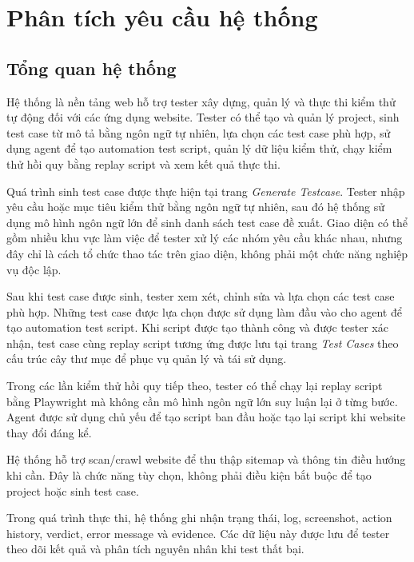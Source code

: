
\chapter{Phân tích yêu cầu hệ thống}
\label{Chapter3}

\section{Tổng quan hệ thống}

Hệ thống là nền tảng web hỗ trợ tester xây dựng, quản lý và thực thi kiểm thử tự động đối với các ứng dụng website. Tester có thể tạo và quản lý project, sinh test case từ mô tả bằng ngôn ngữ tự nhiên, lựa chọn các test case phù hợp, sử dụng agent để tạo automation test script, quản lý dữ liệu kiểm thử, chạy kiểm thử hồi quy bằng replay script và xem kết quả thực thi.

Quá trình sinh test case được thực hiện tại trang \textit{Generate Testcase}. Tester nhập yêu cầu hoặc mục tiêu kiểm thử bằng ngôn ngữ tự nhiên, sau đó hệ thống sử dụng mô hình ngôn ngữ lớn để sinh danh sách test case đề xuất. Giao diện có thể gồm nhiều khu vực làm việc để tester xử lý các nhóm yêu cầu khác nhau, nhưng đây chỉ là cách tổ chức thao tác trên giao diện, không phải một chức năng nghiệp vụ độc lập.

Sau khi test case được sinh, tester xem xét, chỉnh sửa và lựa chọn các test case phù hợp. Những test case được lựa chọn được sử dụng làm đầu vào cho agent để tạo automation test script. Khi script được tạo thành công và được tester xác nhận, test case cùng replay script tương ứng được lưu tại trang \textit{Test Cases} theo cấu trúc cây thư mục để phục vụ quản lý và tái sử dụng.

Trong các lần kiểm thử hồi quy tiếp theo, tester có thể chạy lại replay script bằng Playwright mà không cần mô hình ngôn ngữ lớn suy luận lại ở từng bước. Agent được sử dụng chủ yếu để tạo script ban đầu hoặc tạo lại script khi website thay đổi đáng kể.

Hệ thống hỗ trợ scan/crawl website để thu thập sitemap và thông tin điều hướng khi cần. Đây là chức năng tùy chọn, không phải điều kiện bắt buộc để tạo project hoặc sinh test case.

Trong quá trình thực thi, hệ thống ghi nhận trạng thái, log, screenshot, action history, verdict, error message và evidence. Các dữ liệu này được lưu để tester theo dõi kết quả và phân tích nguyên nhân khi test thất bại.

